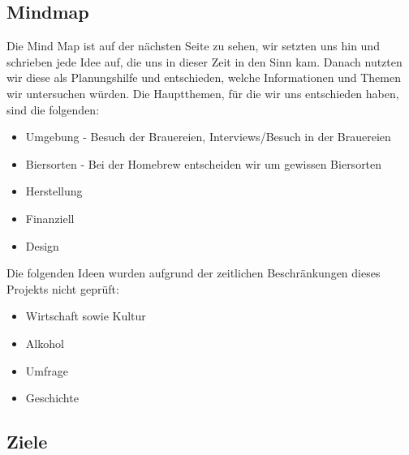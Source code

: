 \subsection{Mindmap}
Die Mind Map ist auf der nächsten Seite zu sehen, wir setzten uns hin und schrieben jede Idee auf, die uns in dieser Zeit in den Sinn kam. Danach nutzten wir diese als Planungshilfe und entschieden, welche Informationen und Themen wir untersuchen würden.
Die Hauptthemen, für die wir uns entschieden haben, sind die folgenden:
\begin{itemize}
   \item Umgebung - Besuch der Brauereien, Interviews/Besuch in der Brauereien
   \item Biersorten - Bei der Homebrew entscheiden wir um gewissen Biersorten
   \item Herstellung
   \item Finanziell
   \item Design
\end{itemize}
Die folgenden Ideen wurden aufgrund der zeitlichen Beschränkungen dieses Projekts nicht geprüft:
\begin{itemize}
   \item Wirtschaft sowie Kultur
   \item Alkohol
   \item Umfrage
   \item Geschichte
\end{itemize}


\subsection{Ziele} \label{introduction}
